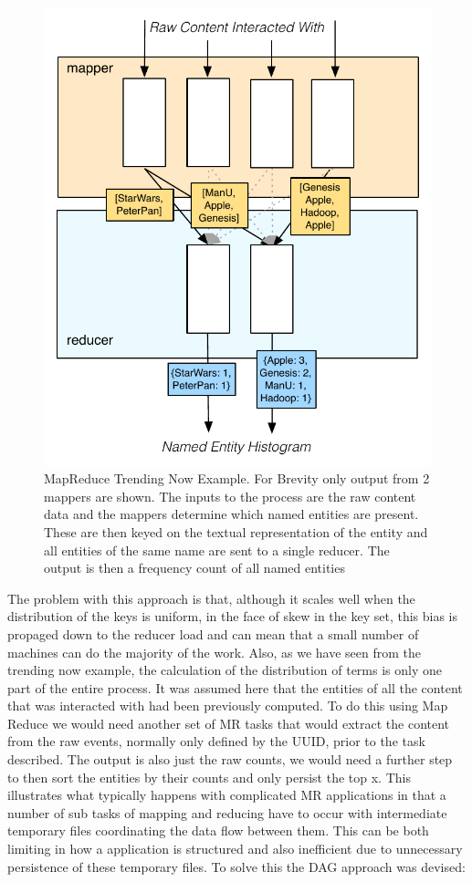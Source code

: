 \documentclass[a4paper,11pt]{scrreprt}
\begin{document}
\begin{figure}[h]
\centering
\includegraphics[scale=0.7] {MapReduceEx.pdf}
\caption{MapReduce Trending Now Example. For Brevity only output from 2 mappers are shown. The inputs to the process are the raw content data and the mappers determine which named entities are present. These are then keyed on the textual representation of the entity and all entities of the same name are sent to a single reducer. The output is then a frequency count of all named entities}
\label{fig:MapReduceEx}
\end{figure}

The problem with this approach is that, although it scales well when the distribution of the keys is uniform, in the face of skew in the key set, this bias is propaged down to the reducer load and can mean that a small number of machines can do the majority of the work. Also, as we have seen from the trending now example, the calculation of the distribution of terms is only one part of the entire process. It was assumed here that the entities of all the content that was interacted with had been previously computed. To do this using Map Reduce we would need another set of MR tasks that would extract the content from the raw events, normally only defined by the UUID, prior to the task described. The output is also just the raw counts, we would need a further step to then sort the entities by their counts and only persist the top x. This illustrates what typically happens with complicated MR applications in that a number of sub tasks of mapping and reducing have to occur with intermediate temporary files coordinating the data flow between them. This can be both limiting in how a application is structured and also inefficient due to unnecessary persistence of these temporary files. To solve this the DAG approach was devised:
\end{document}
